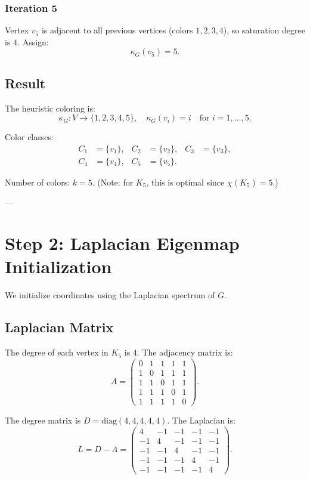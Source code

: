 \documentclass[11pt]{article}
\theoremstyle{definition}
\begin{document}
\subsubsection{Iteration 5}

Vertex $v_5$ is adjacent to all previous vertices (colors $1, 2, 3, 4$), so saturation degree is $4$. Assign:
\[
\kappa_G(v_5) = 5.
\]

\subsection{Result}

The heuristic coloring is:
\[
\kappa_G : V \to \{1, 2, 3, 4, 5\}, \quad \kappa_G(v_i) = i \quad \text{for } i = 1, \ldots, 5.
\]

Color classes:
\begin{align*}
C_1 &= \{v_1\}, & C_2 &= \{v_2\}, & C_3 &= \{v_3\},\\
C_4 &= \{v_4\}, & C_5 &= \{v_5\}.
\end{align*}

Number of colors: $k = 5$. (Note: for $K_5$, this is optimal since $\chi(K_5) = 5$.)

---

\section{Step 2: Laplacian Eigenmap Initialization}

We initialize coordinates using the Laplacian spectrum of $G$.

\subsection{Laplacian Matrix}

The degree of each vertex in $K_5$ is $4$. The adjacency matrix is:
\[
A = \begin{pmatrix}
0 & 1 & 1 & 1 & 1\\
1 & 0 & 1 & 1 & 1\\
1 & 1 & 0 & 1 & 1\\
1 & 1 & 1 & 0 & 1\\
1 & 1 & 1 & 1 & 0
\end{pmatrix}.
\]

The degree matrix is $D = \text{diag}(4, 4, 4, 4, 4)$. The Laplacian is:
\[
L = D - A = \begin{pmatrix}
4 & -1 & -1 & -1 & -1\\
-1 & 4 & -1 & -1 & -1\\
-1 & -1 & 4 & -1 & -1\\
-1 & -1 & -1 & 4 & -1\\
-1 & -1 & -1 & -1 & 4
\end{pmatrix}.
\]
\end{document}
